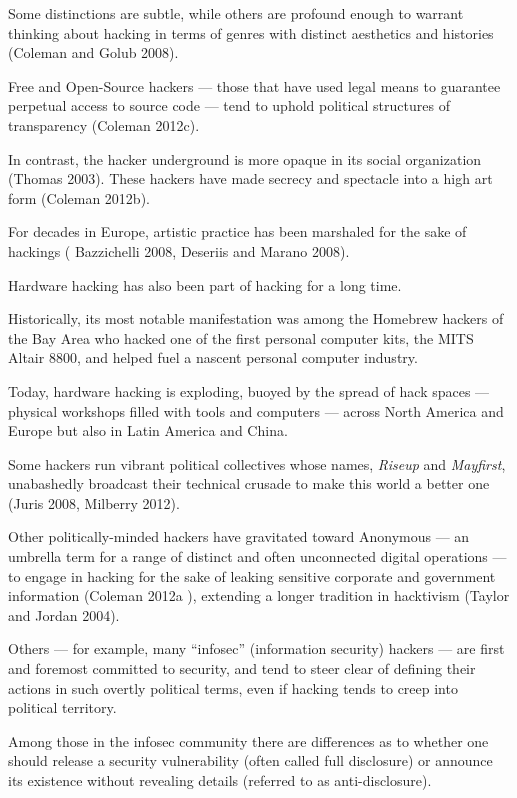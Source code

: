 \documentclass[letterpaper,12pt,english]{sphinxmanual}
\begin{document}
Some
distinctions
are
subtle,
while
others
are
profound
enough
to
warrant
thinking about hacking in terms of
genres with distinct aesthetics and histories
(Coleman
and
Golub
2008).

Free
and Open-Source hackers — those
that
have
used
legal
means
to
guarantee
perpetual
access
to
source
code — tend
to uphold
political
structures
of
transparency
(Coleman
2012c).

In contrast,
the
hacker
underground
is
more
opaque
in its
social
organization
(Thomas
2003).
These
hackers
have
made
secrecy
and
spectacle
into
a
high
art
form
(Coleman
2012b).

For decades
in Europe,
artistic practice
has been marshaled
for the sake of hackings (
Bazzichelli
2008,
Deseriis and Marano 2008).

Hardware
hacking
has
also
been
part
of
hacking for a long time.

Historically,
its
most
notable
manifestation
was
among
the
Homebrew
hackers
of
the
Bay
Area
who
hacked
one of
the
first
personal
computer
kits,
the
MITS
Altair
8800,
and
helped
fuel
a
nascent
personal
computer
industry.

Today,
hardware
hacking
is
exploding,
buoyed
by
the
spread
of
hack
spaces — physical
workshops
filled
with
tools
and
computers — across
North
America
and
Europe but also in Latin America and China.

Some
hackers
run
vibrant
political
collectives
whose
names, \emph{Riseup}
and
\emph{Mayfirst},
unabashedly
broadcast
their
technical
crusade
to
make
this
world
a
better
one
(Juris
2008,
Milberry
2012).

Other
politically-minded
hackers
have
gravitated
toward
Anonymous — an
umbrella
term
for
a
range
of
distinct and often unconnected
digital
operations —
to
engage
in
hacking
for
the
sake
of
leaking
sensitive
corporate
and
government
information
(Coleman
2012a
),
extending
a
longer
tradition
in
hacktivism
(Taylor
and
Jordan
2004).

Others — for
example, many “infosec”
(information
security)
hackers — are
first
and
foremost
committed
to
security,
and
tend
to
steer
clear
of
defining
their
actions
in
such
overtly
political
terms, even
if
hacking
tends
to
creep
into
political
territory.

Among those in the infosec community there are differences as to whether one should release a security vulnerability (often called full disclosure) or announce its existence without revealing details
(referred to as anti-disclosure).
\end{document}
